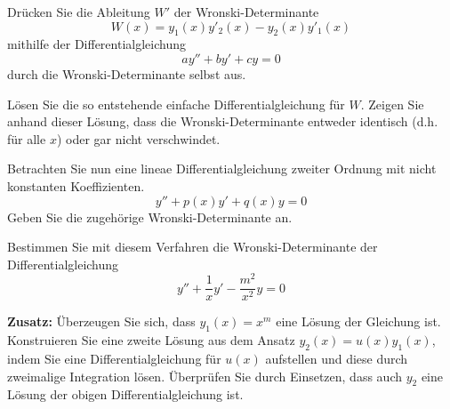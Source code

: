 \begin{atiTask}[
  title = Die Wronski-Determinante
]
  \begin{atiSubtasks}
    \item{
      Drücken Sie die Ableitung $W'$ der Wronski-Determinante
      \[
        W(x) = y_1(x)y'_2(x)-y_2(x)y'_1(x)
      \]
      mithilfe der Differentialgleichung
      \[
        ay'' + by' + cy = 0
      \]
      durch die Wronski-Determinante selbst aus.
    }
    \item{
      Lösen Sie die so entstehende einfache Differentialgleichung für $W$.
      Zeigen Sie anhand dieser Lösung, dass die Wronski-Determinante entweder identisch (d.h. für alle $x$) oder gar nicht verschwindet.
    }
    \item{
      Betrachten Sie nun eine lineae Differentialgleichung zweiter Ordnung mit nicht konstanten Koeffizienten.
      \[
        y'' + p(x)y' + q(x)y = 0
      \]
      Geben Sie die zugehörige Wronski-Determinante an.
    }
    \item{
      Bestimmen Sie mit diesem Verfahren die Wronski-Determinante der Differentialgleichung
      \[
        y'' + \frac{1}{x}y' - \frac{m^2}{x^2}y = 0
      \]
    }
    \item{
      \textbf{Zusatz:}
      Überzeugen Sie sich, dass $y_1(x)=x^m$ eine Lösung der Gleichung ist.
      Konstruieren Sie eine zweite Lösung aus dem Ansatz $y_2(x) = u(x)y_1(x)$, indem Sie eine Differentialgleichung für $u(x)$ aufstellen und diese durch zweimalige Integration lösen.
      Überprüfen Sie durch Einsetzen, dass auch $y_2$ eine Lösung der obigen Differentialgleichung ist.
    }
  \end{atiSubtasks}
\end{atiTask}